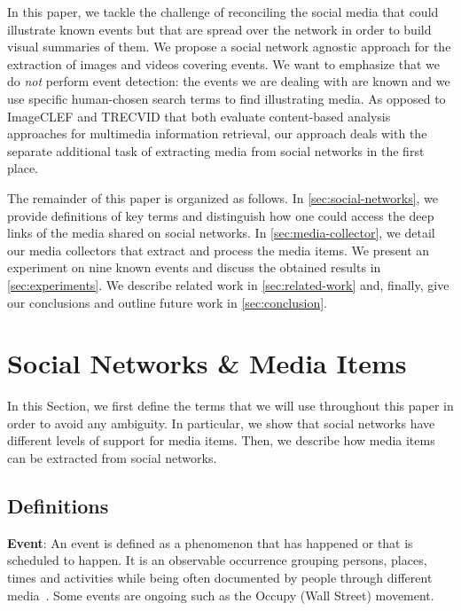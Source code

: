 \documentclass{acm_proc_article-sp}
\let\oldemph\emph
\renewcommand{\emph}[1]{\oldemph{\fontsize{9}{9}\selectfont #1}}
\begin{document}
In this paper, we tackle the challenge of reconciling the social media that could illustrate known events but that
are spread over the network in order to build visual summaries of them. We propose a social network agnostic
approach for the extraction of images and videos covering events. We want to emphasize that we do \emph{not} perform
event detection: the events we are dealing with are known and we use specific human-chosen search terms to find illustrating
media. As opposed to \mbox{ImageCLEF} and \mbox{TRECVID} that both evaluate content-based analysis approaches for
multimedia information retrieval, our approach deals with the separate additional task of extracting media from social networks
in the first place.

The remainder of this paper is organized as follows. In \autoref{sec:social-networks}, we provide definitions of key terms
and distinguish how one could access the deep links of the media shared on social networks. In \autoref{sec:media-collector},
we detail our media collectors that extract and process the media items. We present an experiment on nine known events and
discuss the obtained results in \autoref{sec:experiments}. We describe related work in \autoref{sec:related-work} and,
finally, give our conclusions and outline future work in \autoref{sec:conclusion}.


\section{Social Networks \& Media Items}                                    \label{sec:social-networks}
In this Section, we first define the terms that we will use throughout this paper in order to avoid any ambiguity. In particular, we show that social networks have different levels of support for media items. Then, we describe how media items can be extracted from social networks.

\subsection{Definitions}
\textbf{Event}: An event is defined as a phenomenon that has happened or that is scheduled to happen. It is an observable occurrence grouping
persons, places, times and activities while being often documented by people through different media~\cite{Liu:ICMR11}. Some events
are ongoing such as the Occupy (Wall Street) movement.
\end{document}
